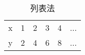 \begin{table}[ht]
  \centering
  \begin{tabular}{llllll}
    \midrule
      x & 1 & 2 & 3 & 4 & ... \\
      y & 2 & 4 & 6 & 8 & ... \\
    \bottomrule
  \end{tabular}
  \caption{列表法}
  \label{tab:grades}
\end{table}